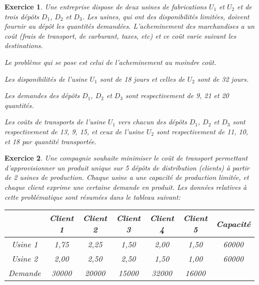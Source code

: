 \documentclass[french]{beamer}
\newtheorem{exercice}{Exercice}
\begin{document}
\begin{frame}
  \begin{exercice}
    Une entreprise dispose de  deux usines de fabrications $U_1$ et  $U_2$ et de trois
    dépôts  $D_1$, $D_2$  et  $D_3$. Les  usines, qui  ont  des disponibilités  limitées,
    doivent  fournir  au  dépôt  les  quantités  demandées.  L’acheminement  des
    marchandises a un coût (frais de  transport, de carburant, taxes, etc) et ce
    coût varie suivant les destinations.

    Le  problème qui se pose  est celui de
    l’acheminement au moindre coût. 


    Les disponibilités de l’usine $U_1$ sont de 18 jours et celles 
de $U_2$ sont de 32 jours.

Les demandes des dépôts $D_1$, $D_2$ et $D_3$ sont respectivement de 9, 21 et
20 quantités.

Les coûts  de transports de l’usine $U_1$  vers chacun des dépôts  $D_1$, $D_2$  et  $D_3$
sont respectivement de 13,  9, 15, et ceux de l’usine  $U_2$ sont respectivement de
11, 10, et 18 par quantité transportée. 
  \end{exercice}
\end{frame}



\begin{frame}
  \begin{exercice}
  Une   compagnie   souhaite  minimiser   le   coût   de  transport   permettant
  d’approvisionner un  produit unique sur  5 dépôts de distribution  (clients) à
  partir de  2 usines de production.  Chaque usine a une  capacité de production
  limitée, et chaque client exprime une certaine demande en produit. Les données
  relatives à cette problématique sont résumées dans le tableau suivant:

  {\tiny 
    \begin{center}
  \begin{tabular}{|c|c|c|c|c|c|c|}
     \cline{2-7}
     \multicolumn{1}{c|}{}&Client 1&Client 2&Client 3&Client 4& Client 5& Capacité\\
    \hline
    Usine
    1&1,75\texteuro{}&2,25\texteuro{}&1,50\texteuro{}&2,00\texteuro{}&1,50\texteuro{}&60000\\
    \hline
    Usine
    2&2,00\texteuro{}&2,50\texteuro{}&2,50\texteuro{}&1,50\texteuro{}&1,00\texteuro{}&60000\\
    \hline
    Demande & 30000 &20000 &15000&32000&16000&\\
    \hline
  \end{tabular}
 \end{center}
}
\end{exercice}
\end{frame}
\end{document}
